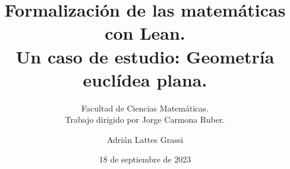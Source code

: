 \documentclass[t, aspectratio=169]{beamer}
\title{Formalización de las matemáticas con Lean.\\ Un caso de estudio: Geometría euclídea plana.}
\author{Adrián Lattes Grassi}
\date{18 de septiembre de 2023}
\subtitle{Facultad de Ciencias Matemáticas.\\Trabajo dirigido por Jorge Carmona Ruber.}
\begin{document}
\frame{\titlepage}


\end{document}
